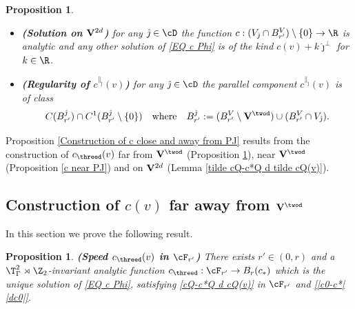 \documentclass[11pt,a4paper,reqno]{article}
\numberwithin{equation}{section}
\newtheorem{proposition}[theorem]{Proposition}
\theoremstyle{definition}
\begin{document}
\begin{proposition}
\begin{itemize}
    \noindent
           \item  {\bf (Solution on ${\bf V}^{2d}$)}
            for any 
    $ \hat \jmath  \in \cD  $ the function 
    $c  : 
         (V_{\hat \jmath} \cap B_{r'}^V )\setminus\{0\}\to  \R $ 
    is analytic and
    any other solution of \eqref{EQ c Phi} is of the kind $c(v)+k\hat \jmath^\bot$ for $k\in \R$.
\item 
{\bf (Regularity of $c^{\parallel_{\hat \jmath}}(v)$)}
for any $ \hat \jmath \in \cD $
   the parallel component $c^{\parallel_{\hat \jmath}}(v)  $  is  of class 
        \begin{equation}\label{c1Q U tilde c1Q}
         C(B_{r'}^{\hat \jmath})\cap C^1(B_{r'}^{\hat \jmath}\setminus\{0\})\quad \text{where}\quad B_{r'}^{\hat \jmath} := 
         (B_{r'}^V\setminus {\bf V}^{\twod})\cup (B_{r'}^V\cap V_{\hat \jmath}). 
        \end{equation}
    \end{itemize}
\end{proposition}
  Proposition  \ref{Construction of c close and away from PJ}  results from the construction of $ c_{\threed} (v) $ far from $ {\bf V}^{\twod}$ 
  (Proposition \ref{Construction of c}), near ${\bf V}^{\twod}$ (Proposition \ref{c near PJ}) and on $ {\bf V}^{2d}$ (Lemma \ref{tilde cQ-c*Q d tilde cQ(v)}). 

 \subsection{Construction of $ c (v) $ far away 
 from $ {\bf V}^{\twod}$}\label{sec:far}

In this section we prove the 
following result.

\begin{proposition}\label{Construction of c}
    {\bf (Speed  $c_{\threed}(v)$ in $\cF_{r'}$) 
    }
    There exists $ r'\in (0,r)$ and a $\T^2_\Gamma\rtimes \Z_2$-invariant analytic function 
    $
        c_{\threed}: \cF_{r'} \to B_{r}(c_*) 
    $ 
    which is the unique solution of \eqref{EQ c Phi}, 
    satisfying \eqref{cQ-c*Q d cQ(v)} in $\cF_{r'}$ and \eqref{|c0-c*| |dc0|}.
\end{proposition}

\end{document}
